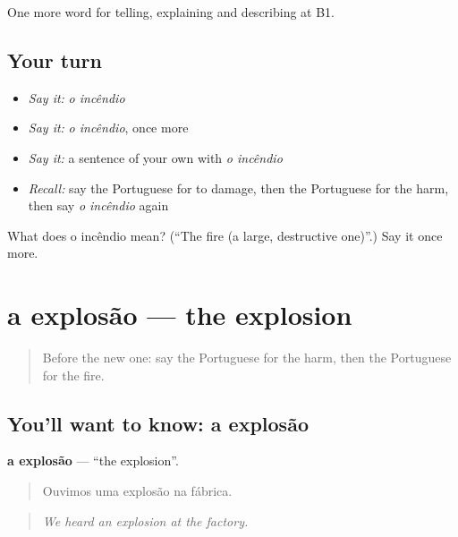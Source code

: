 \begin{grammarlens}[title={What you've built}]
One more word for telling, explaining and describing at B1.
\end{grammarlens}

\subsection*{Your turn}
\begin{itemize}
\raggedright
  \item \emph{Say it:} \emph{o incêndio}
  \item \emph{Say it:} \emph{o incêndio}, once more
  \item \emph{Say it:} a sentence of your own with \emph{o incêndio}
  \item \emph{Recall:} say the Portuguese for to damage, then the Portuguese for the harm, then say \emph{o incêndio} again
\end{itemize}

\begin{tcolorbox}[breakable,colback=teal!4,colframe=teal!35!black,title={Before you move on}]
What does o incêndio mean? (\textquotedblleft{}The fire (a large, destructive one)\textquotedblright{}.) Say it once more.
\end{tcolorbox}
\section[a explosão]{a explosão — the explosion}

\label{lesson:PT-C301-explosao}



\begin{quote}
Before the new one: say the Portuguese for the harm, then the Portuguese for the fire.
\end{quote}

\subsection*{You'll want to know: a explosão}
\textbf{a explosão} — \textquotedblleft{}the explosion\textquotedblright{}.

\begin{quote}
Ouvimos uma explosão na fábrica.
\end{quote}

\begin{quote}
\emph{We heard an explosion at the factory.}
\end{quote}

